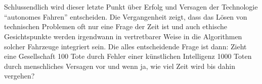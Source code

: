 \documentclass[10pt,a4paper]{article}
\begin{document}
\\
\\
Schlussendlich wird dieser letzte Punkt über Erfolg und Versagen der Technologie ``autonomes Fahren'' entscheiden. Die Vergangenheit zeigt, dass das Lösen von technischen Problemen oft nur eine Frage der Zeit ist und auch ethische Gesichtspunkte werden irgendwann in vertretbarer Weise in die Algorithmen solcher Fahrzeuge integriert sein. Die alles entscheidende Frage ist dann: Zieht eine Gesellschaft 100 Tote durch Fehler einer künstlichen Intelligenz 1000 Toten durch menschliches Versagen vor und wenn ja, wie viel Zeit wird bis dahin vergehen? 

\printbibliography
\end{document}
